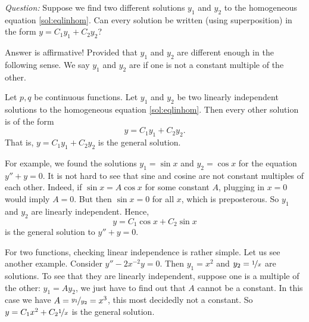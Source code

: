 \emph{Question:} Suppose we find two different solutions $y_1$ and $y_2$ to the
homogeneous equation \eqref{sol:eqlinhom}.  Can every solution
be written (using superposition) in the form
$y = C_1 y_1 + C_2 y_2$?

Answer is affirmative!  Provided that $y_1$ and $y_2$ are different enough in
the following sense.  We say $y_1$ and $y_2$ are \emph{} if one is not a constant multiple of the other.

\begin{theorem}
Let $p, q$ be continuous functions.
Let $y_1$ and $y_2$ be two linearly independent
solutions to the homogeneous equation \eqref{sol:eqlinhom}. 
Then every other solution is 
of the form
\begin{equation*}
y = C_1 y_1 + C_2 y_2 .
\end{equation*}
That is, $y = C_1 y_1 + C_2 y_2$ is the general solution.
\end{theorem}

For example, we found the solutions
$y_1 = \sin x$ and $y_2 = \cos x$ for the
equation $y'' + y = 0$.  It is not hard to see that sine and cosine are not
constant
multiples of each other.  Indeed, if $\sin x = A \cos x$ for some constant $A$,
plugging in $x=0$ would imply $A = 0$.  But then $\sin x = 0$ for all
$x$, which is preposterous.
So $y_1$ and $y_2$ are linearly independent.  Hence,
\begin{equation*}
y = C_1 \cos x + C_2 \sin x 
\end{equation*}
is the general solution to $y'' + y = 0$.

For two functions, checking linear independence is rather simple.  Let us
see another example.  Consider $y''-2x^{-2}y = 0$.  Then $y_1 = x^2$ and $y_2 =
\nicefrac{1}{x}$ are solutions.  To see that they are linearly independent,
suppose one is a multiple of the other: $y_1 = A y_2$, we just have to find
out that $A$ cannot be a constant.  In this case we have $A =
\nicefrac{y_1}{y_2} = x^3$, this most decidedly not a constant.
So $y = C_1 x^2 + C_2 \nicefrac{1}{x}$ is the general solution.

\medskip

